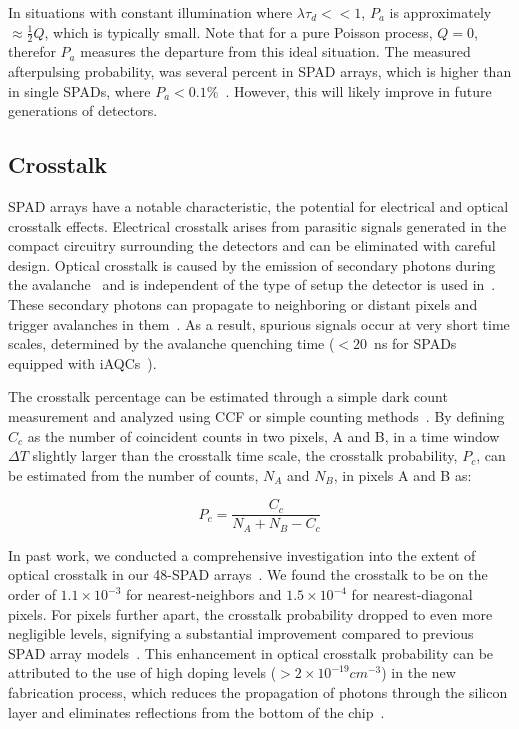\noindent
In situations with constant illumination where $\lambda \tau_d << 1$, $P_a$ is approximately $\approx \frac{1}{2}Q$, which is typically small. 
Note that for a pure Poisson process, $Q = 0$, therefor $P_a$ measures the departure from this ideal situation. 
The measured afterpulsing probability, was several percent in \ac{SPAD} arrays, which is higher than in single \ac{SPAD}s, where $P_a<0.1\%$~\cite{ingargiola_PLOS1_2016}. 
However, this will likely improve in future generations of detectors.

\subsection{Crosstalk}
\label{sec:crosstalk}

\ac{SPAD} arrays have a notable characteristic, the potential for electrical and optical crosstalk effects. 
Electrical crosstalk arises from parasitic signals generated in the compact circuitry surrounding the detectors and can be eliminated with careful design. 
Optical crosstalk is caused by the emission of secondary photons during the avalanche~\cite{spitzer_PR_1957} and is independent of the type of setup the detector is used in~\cite{bude_PRBC_1992,lacaita_IEEE_1993}. 
These secondary photons can propagate to neighboring or distant pixels and trigger avalanches in them~\cite{rech_OE_2008}. 
As a result, spurious signals occur at very short time scales, determined by the avalanche quenching time ($< 20$~ns for \ac{SPAD}s equipped with \ac{iAQC}s~\cite{gallivanoni_IEEETNS_2010}).

The crosstalk percentage can be estimated through a simple dark count measurement and analyzed using \ac{CCF} or simple counting methods~\cite{restelli_JMO_2007,ingargiola_PLOS1_2016,ingargiola_NIMA_2018}. 
By defining $C_c$ as the number of coincident counts in two pixels, A and B, in a time window $\Delta T$ slightly larger than the crosstalk time scale, the crosstalk probability, $P_c$, can be estimated from the number of counts, $N_A$ and $N_B$, in pixels A and B as:

\begin{equation}
\label{eqn:Pc}
P_c=\frac{C_c}{N_A+N_B-C_c}
\end{equation}

In past work, we conducted a comprehensive investigation into the extent of optical crosstalk in our 48-\ac{SPAD} arrays~\cite{ingargiola_NIMA_2018}. 
We found the crosstalk to be on the order of $1.1\times 10^{-3}$ for nearest-neighbors and $1.5\times 10^{-4}$ for nearest-diagonal pixels.
For pixels further apart, the crosstalk probability dropped to even more negligible levels, signifying a substantial improvement compared to previous \ac{SPAD} array models~\cite{ingargiola_PLOS1_2016}. 
This enhancement in optical crosstalk probability can be attributed to the use of high doping levels ($> 2\times 10^{-19} cm^{-3}$) in the new fabrication process, which reduces the propagation of photons through the silicon layer and eliminates reflections from the bottom of the chip~\cite{spitzer_PR_1957}.

